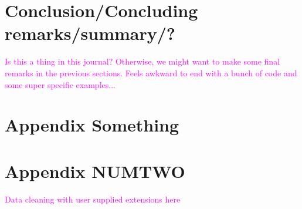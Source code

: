 \documentclass[article]{jss}
\newcommand{\hl}[1]{\textcolor{magenta}{#1}}
\begin{document}
\section{Conclusion/Concluding remarks/summary/?}
\hl{Is this a thing in this journal? Otherwise, we might want to make some final remarks in the previous sections. Feels awkward to end with a bunch of code and some super specific examples...}



\appendix

\section{Appendix Something}


\section{Appendix NUMTWO}
\hl{Data cleaning with user supplied extensions here}
\end{document}
